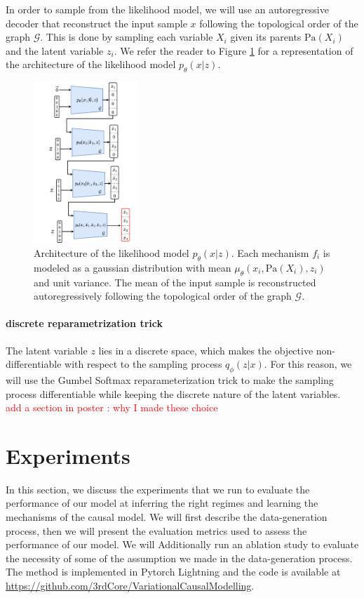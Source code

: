 \documentclass{article}
\newcommand\todo[1]{\textcolor{red}{#1}}
\begin{document}
In order to sample from the likelihood model, we will use an autoregressive decoder that reconstruct the input sample $x$ following the topological order of the graph $\mathcal{G}$. This is done by sampling each variable $X_i$ given its parents $\text{Pa}(X_i)$ and the latent variable $z_i$. We refer the reader to Figure \ref{fig:architecture_decoder} for a representation of the architecture of the likelihood model $p_\theta(x | z)$.
\begin{figure}
\centering
    \includegraphics[width=0.35\textwidth]{images/architecture_decoder.pdf}
    \caption{Architecture of the likelihood model $p_\theta(x | z)$. Each mechanism $f_i$ is modeled as a gaussian distribution with mean $\mu_\theta(x_i, \text{Pa}(X_i), z_i)$ and unit variance. The mean of the input sample is reconstructed autoregressively following the topological order of the graph $\mathcal{G}$.}
    \label{fig:architecture_decoder}
\end{figure}
\paragraph{discrete reparametrization trick}
The latent variable $z$ lies in a discrete space, which makes the objective non-differentiable with respect to the sampling process $q_\phi(z | x)$. For this reason, we will use the Gumbel Softmax reparameterization trick \citep{jang2017categoricalreparameterizationgumbelsoftmax} to make the sampling process differentiable while keeping the discrete nature of the latent variables.
 \todo{add a section in poster  : why I made these choice}
\section{Experiments}\label{subsec:Experiments}
In this section, we discuss the experiments that we run to evaluate the performance of our model at inferring the right regimes and learning the mechanisms of the causal model. We will first describe the data-generation process, then we will present the evaluation metrics used to assess the performance of our model. We will Additionally run an ablation study to evaluate the necessity of some of the assumption we made in the data-generation process. The method is implemented in Pytorch Lightning and the code is available at \url{https://github.com/3rdCore/VariationalCausalModelling}.
\end{document}
